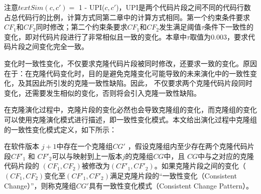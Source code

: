   
注意$\mathit {textSim}(c,c')= $ 1 - UPI($ c,c'$)，UPI是两个代码片段之间不同的代码行数占总代码行的比例，计算方式同第二章中的计算方式相同。第一个约束条件要求 $ CF_1 $和$CF_2 $同时修改；第二个约束条要求$ CF_1 $和$CF_2$发生满足阈值$\tau$条件下一致性的变化，即对代码片段进行了非常相似且一致的变化。本章中$\tau$取值为$0.003$，要求代码片段之间变化完全一致。

变化时一致性变化，不仅要求克隆代码片段被同时修改，还要求一致的变化。原因在于：在克隆代码变化时，目的是避免克隆变化可能导致的未来演化中的一致性变化，及其因此所引发的克隆一致性缺陷。因此， 不仅要求两个克隆代码片段同时变化，还需要发生相似的变化，否则将会引入克隆一致性缺陷。

在克隆演化过程中，克隆片段的变化必然也会导致克隆组的变化，而克隆组的变化可以使用克隆演化模式进行描述，即一致性变化模式。本文给出演化过程中克隆组的一致性变化模式定义，如下所示：\\

\begin{definition}
[变化时一致性变化模式] 
\label{def-changingpattern}
在软件版本 $j+1$中存在一个克隆组$CG'$ ，假设克隆组内至少存在两个克隆代码片段$CF'_1$ 和 $CF'_2$可以与映射到上一版本$j$的克隆组$CG$中，且 $CG$中与之对应的克隆代码片段的 $(CF_1,CF_2)$被修改为$(CF'_1,CF'_2)$。如果克隆片段之间的变化（ $(CF_1,CF_2)$变化至$(CF'_1,CF'_2)$满足克隆片段的“一致性变化（Consistent Change）”，则称克隆组$CG'$具有一致性变化模式（Consistent Change Pattern）。
\end{definition}



